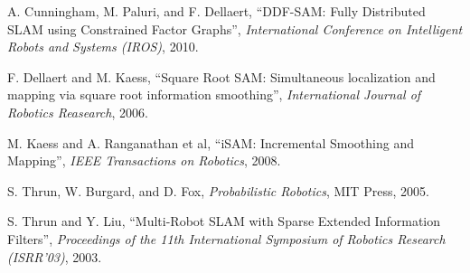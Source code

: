 \documentclass[11pt]{article}
\begin{document}
\begin{thebibliography}{12}
        A. Cunningham, M. Paluri, and F. Dellaert, ``DDF-SAM: Fully Distributed SLAM using Constrained Factor Graphs'', \emph{International Conference on Intelligent Robots and Systems (IROS)}, 2010.

        F. Dellaert and M. Kaess, ``Square Root SAM: Simultaneous localization and mapping via square root information smoothing'', \emph{International Journal of Robotics Reasearch}, 2006.

        M. Kaess and A. Ranganathan et al, ``iSAM: Incremental Smoothing and Mapping'', \emph{IEEE Transactions on Robotics}, 2008.

        S. Thrun, W. Burgard, and D. Fox, \emph{Probabilistic Robotics}, MIT Press, 2005.

        S. Thrun and Y. Liu, ``Multi-Robot SLAM with Sparse Extended Information Filters'', \emph{Proceedings of the 11th International Symposium of Robotics Research (ISRR'03)}, 2003.

\end{thebibliography}
\end{document}
